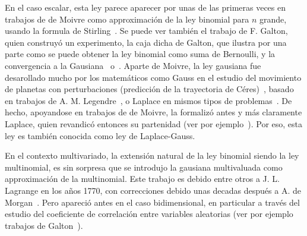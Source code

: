 \label{Sssec:MP:Gaussiana}

En el caso escalar,  esta ley parece aparecer por unas de  las primeras veces en
trabajos de de  Moivre como approximaci\'on de la ley  binomial para $n$ grande,
usando la formula de Stirling~\cite{Moi30, Moi33, Moi56, Pea24, PeaMoi26, Dem33,
  Hal84,  Hal90,  JohKot95:v1, DavEdw01,  Hal06}.   Se  puede  ver tambi\'en  el
trabajo  de F.   Galton,  quien construy\'o  un  experimento, la  caja dicha  de
Galton, que  ilustra por una  parte como se  puede obtener la ley  binomial como
suma   de  Bernoulli,   y   la  convergencia   a  la   Gausiana~\cite[Figs.~7-9,
p.~63]{Gal89}  o~\cite[p.~38]{Pea20}.  Aparte  de  Moivre, la  ley gausiana  fue
desarollado mucho por los matem\'aticos  como Gauss en el estudio del movimiento
de   planetas   con   perturbaciones   (predicci\'on  de   la   trayectoria   de
C\'eres)~\cite{Gau09,  Pea24, DavEdw01,  Hal06}, basado  en trabajos  de  A.  M.
Legendre~\cite{Leg05,   DavEdw01,  Hal06},   o  Laplace   en  mismos   tipos  de
problemas~\cite{Lap09, Lap09:Supp, Lap12, Lap14, Lap20, Pea24, DavEdw01, Hal06}.
De hecho,  apoyandose en  trabajos de  de Moivre, la  formaliz\'o antes  y m\'as
claramente  Laplace,   quien  revandic\'o   entonces  su  partenidad   (ver  por
ejemplo~\cite{Pea20}).   Por eso,  esta ley  es tambi\'en  conocida como  ley de
Laplace-Gauss.

En el contexto multivariado, la extensi\'on natural de la ley binomial siendo la
ley multinomial, es sin sorpresa  que se introdujo la gausiana multivaluada como
approximaci\'on de la multinomial.  Este trabajo  es debido entre otros a J.  L.
Lagrange en  los a\~nos 1770, con  correcciones debido unas  decadas despu\'es a
A. de  Morgan~\cite{Mor38}. Pero apareci\'o  antes en el caso  bidimensional, en
particular  a  trav\'es  del  estudio  del coeficiente  de  correlaci\'on  entre
variables   aleatorias  (ver   por  ejemplo   trabajos   de  Galton~\cite{Gal77,
  Gal77:Nature, Pea20}).

